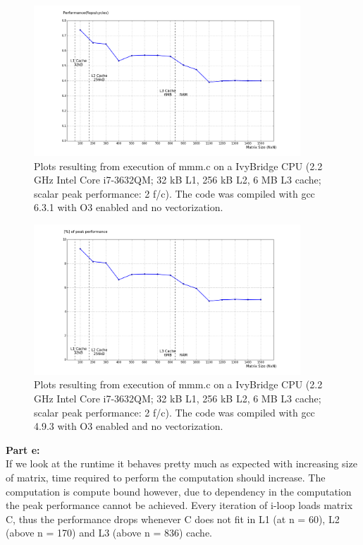\documentclass[letterpaper, 11pt]{article}
\begin{document}
\begin{figure}[h!]
    \centering
    \includegraphics[width=100mm]{sol_3_2}
    \caption{Plots resulting from execution of mmm.c on a IvyBridge CPU (2.2 GHz Intel Core i7-3632QM; 32 kB L1, 256 kB L2, 6 MB L3 cache; scalar peak performance: 2 f/c). The code was compiled with gcc 6.3.1 with O3 enabled and no vectorization.}
    \label{fig:performance}
\end{figure}

\begin{figure}[h!]
    \centering
    \includegraphics[width=100mm]{sol_3_3}
    \caption{Plots resulting from execution of mmm.c on a IvyBridge CPU (2.2 GHz Intel Core i7-3632QM; 32 kB L1, 256 kB L2, 6 MB L3 cache; scalar peak performance: 2 f/c). The code was compiled with gcc 4.9.3 with O3 enabled and no vectorization.}
    \label{fig:percentage}
\end{figure}
\textbf{Part e:} \\
If we look at the runtime it behaves pretty much as expected with increasing size of matrix, time required to perform the computation should increase.
The computation is compute bound however, due to dependency in the computation the peak performance cannot be achieved. Every iteration of i-loop loads matrix C, thus the performance drops whenever C does not fit in L1 (at n = 60), L2 (above n = 170) and L3 (above n = 836) cache.

\bigskip
\end{document}
